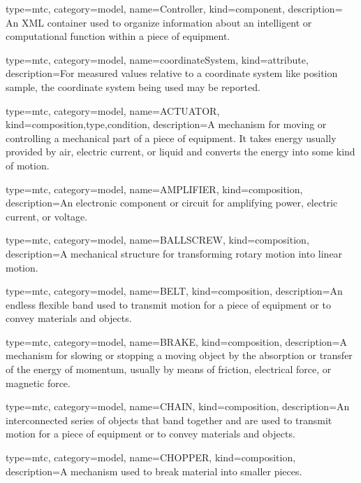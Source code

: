 {
  type=mtc,
  category=model,
  name={Controller},
  kind={component},
  description= {An XML container used to organize information about an intelligent or computational function within a piece of equipment.}
}


{
  type=mtc,
  category=model,
  name={coordinateSystem},
  kind={attribute},
  description={For measured values relative to a coordinate system like \gls{position sample}, the coordinate system being used may be reported.}
}


{
  type=mtc,
  category=model,
  name={ACTUATOR},
  kind={composition,type,condition},
  description={A mechanism for moving or controlling a mechanical part of a piece of equipment.   \newline It takes energy usually provided by air, electric current, or liquid and converts the energy into some kind of motion. }
}


{
  type=mtc,
  category=model,
  name={AMPLIFIER},
  kind={composition},
  description={An electronic component or circuit for amplifying power, electric current, or voltage.}
}


{
  type=mtc,
  category=model,
  name={BALLSCREW},
  kind={composition},
  description={A mechanical structure for transforming rotary motion into linear motion.}
}


{
  type=mtc,
  category=model,
  name={BELT},
  kind={composition},
  description={An endless flexible band used to transmit motion for a piece of equipment or to convey materials and objects.}
}


{
  type=mtc,
  category=model,
  name={BRAKE},
  kind={composition},
  description={A mechanism for slowing or stopping a moving object by the absorption or transfer of the energy of momentum, usually by means of friction, electrical force, or magnetic force.}
}


{
  type=mtc,
  category=model,
  name={CHAIN},
  kind={composition},
  description={An interconnected series of objects that band together and are used to transmit motion for a piece of equipment or to convey materials and objects.}
}


{
  type=mtc,
  category=model,
  name={CHOPPER},
  kind={composition},
  description={A mechanism used to break material into smaller pieces.}
}


